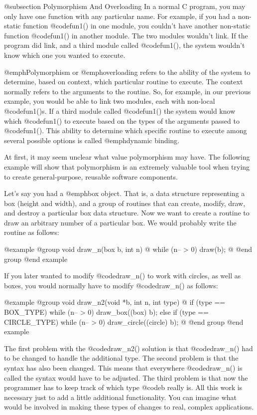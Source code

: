 @subsection Polymorphism And Overloading
In a normal C program, you may only have one function with any particular
name.  For example, if you had a non-static function @code{fun1()} in one
module, you couldn't have another non-static function @code{fun1()} in
another module.  The two modules wouldn't link.  If the program did
link, and a third module called @code{fun1()}, the system wouldn't know
which one you wanted to execute.

@emph{Polymorphism} or @emph{overloading} refers to the ability of the
system to determine, based on context, which particular routine to
execute.  The context normally refers to the arguments to the routine.
So, for example, in our previous example, you would be able to link two
modules, each with non-local @code{fun1()}s.  If a third module called
@code{fun1()} the system would know which @code{fun1()} to execute based
on the types of the arguments passed to @code{fun1()}.  This ability to
determine which specific routine to execute among several possible
options is called @emph{dynamic binding}.

At first, it may seem unclear what value polymorphism may have.  The
following example will show that polymorphism is an extremely valuable
tool when trying to create general-purpose, reusable software
components.

Let's say you had a @emph{box} object.  That is, a data structure
representing a box (height and width), and a group of routines that
can create, modify, draw, and destroy a particular box data structure.
Now we want to create a routine to draw an arbitrary number of a
particular box.  We would probably write the routine as follows:

@example
@group
void    draw_n(box b, int n)
@{
        while (n-- > 0)
                draw(b);
@}
@end group
@end example

If you later wanted to modify @code{draw_n()} to work with circles, as
well as boxes, you would normally have to modify @code{draw_n()} as follows:

@example
@group
void    draw_n2(void *b, int n, int type)
@{
        if (type == BOX_TYPE)
                while (n-- > 0)
                        draw_box((box) b);
        else if (type == CIRCLE_TYPE)
                while (n-- > 0)
                        draw_circle((circle) b);
@}
@end group
@end example

The first problem with the @code{draw_n2()} solution is that @code{draw_n()}
had to be changed to handle the additional type.  The second problem is that
the syntax has also been changed.  This means that everywhere @code{draw_n()}
is called the syntax would have to be adjusted.  The third problem is that
now the programmer has to keep track of which type @code{b} really is.
All this work is necessary just to add a little additional functionality.
You can imagine what would be involved in making these types of changes
to real, complex applications.

